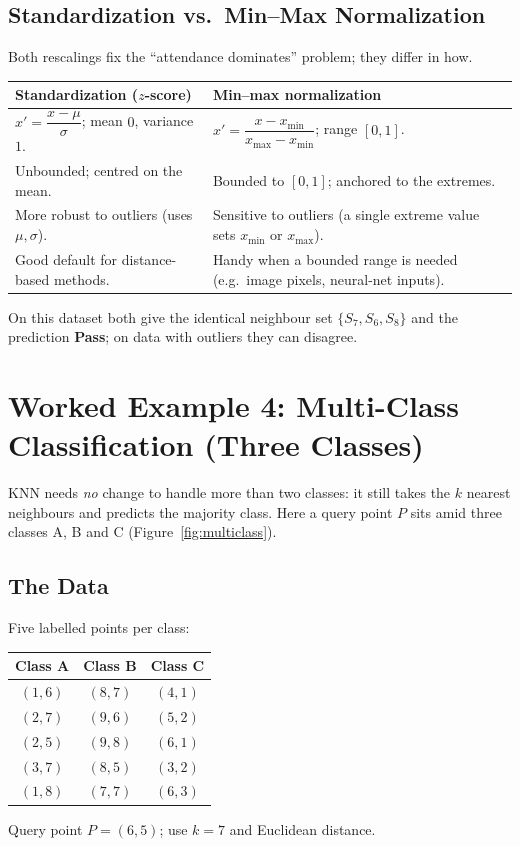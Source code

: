 \documentclass[11pt,a4paper]{report}
\theoremstyle{definition}
\theoremstyle{remark}
\begin{document}
	\section{Standardization vs.\ Min--Max Normalization}
	Both rescalings fix the ``attendance dominates'' problem; they differ in how.
	\begin{center}
		\begin{tabular}{@{}p{6.4cm}p{6.4cm}@{}}
			\toprule
			\textbf{Standardization ($z$-score)} & \textbf{Min--max normalization}\\
			\midrule
			$x'=\dfrac{x-\mu}{\sigma}$; mean $0$, variance $1$. &
			$x'=\dfrac{x-x_{\min}}{x_{\max}-x_{\min}}$; range $[0,1]$.\\
			Unbounded; centred on the mean. & Bounded to $[0,1]$; anchored to the extremes.\\
			More robust to outliers (uses $\mu,\sigma$). & Sensitive to outliers (a single
			extreme value sets $x_{\min}$ or $x_{\max}$).\\
			Good default for distance-based methods. & Handy when a bounded range is needed
			(e.g.\ image pixels, neural-net inputs).\\
			\bottomrule
		\end{tabular}
	\end{center}
	On this dataset both give the identical neighbour set $\{S_7,S_6,S_8\}$ and the
	prediction \textbf{Pass}; on data with outliers they can disagree.
	
	\chapter{Worked Example 4: Multi-Class Classification (Three Classes)}
	\label{ch:multiclass}
	
	KNN needs \emph{no} change to handle more than two classes: it still takes the
	$k$ nearest neighbours and predicts the majority class. Here a query point $P$
	sits amid three classes A, B and C (Figure~\ref{fig:multiclass}).
	
	\section{The Data}
	Five labelled points per class:
	\begin{center}
		\renewcommand{\arraystretch}{1.2}
		\begin{tabular}{c c c}
			\toprule
			\textbf{Class A} & \textbf{Class B} & \textbf{Class C}\\
			\midrule
			$(1,6)$ & $(8,7)$ & $(4,1)$\\
			$(2,7)$ & $(9,6)$ & $(5,2)$\\
			$(2,5)$ & $(9,8)$ & $(6,1)$\\
			$(3,7)$ & $(8,5)$ & $(3,2)$\\
			$(1,8)$ & $(7,7)$ & $(6,3)$\\
			\bottomrule
		\end{tabular}
	\end{center}
	Query point $P=(6,5)$; use $k=7$ and Euclidean distance.
	
\end{document}
